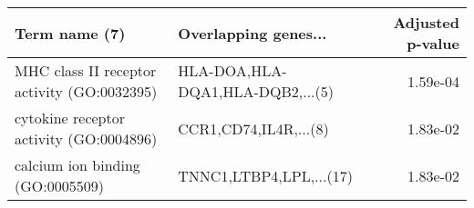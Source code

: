\begin{tabular}{llr}
\toprule
                              Term name (7) &             Overlapping genes... &  Adjusted p-value \\
\midrule
MHC class II receptor activity (GO:0032395) & HLA-DOA,HLA-DQA1,HLA-DQB2,...(5) &          1.59e-04 \\
    cytokine receptor activity (GO:0004896) &            CCR1,CD74,IL4R,...(8) &          1.83e-02 \\
           calcium ion binding (GO:0005509) &          TNNC1,LTBP4,LPL,...(17) &          1.83e-02 \\
\bottomrule
\end{tabular}
